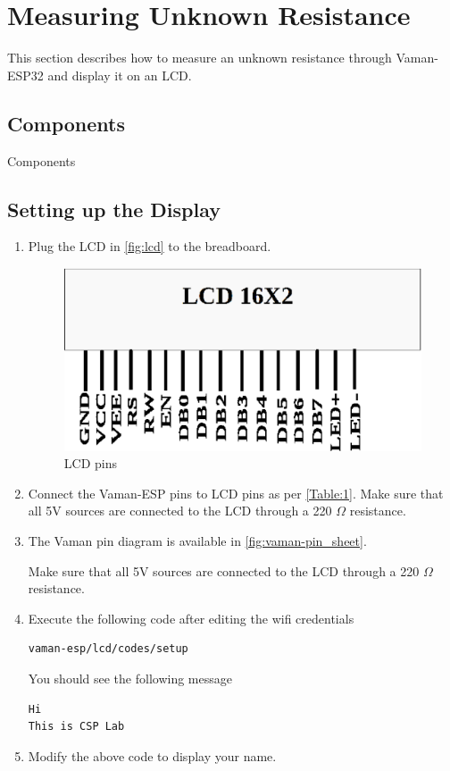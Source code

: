 \section{Measuring Unknown Resistance}
This section describes how to measure an unknown resistance through Vaman-ESP32
and display it on an LCD.
\subsection{Components}
\begin{table}[!ht]
\centering

\caption{Components}
\label{table:components}
\end{table}

\subsection{Setting up the Display}
\begin{enumerate}
\item
Plug the LCD in \autoref{fig:lcd} to the breadboard.

\begin{figure}
\centering
\includegraphics[width=\columnwidth]{vaman-esp32/lcd/figs/lcd.eps}
\caption{LCD pins}
\label{fig:lcd}
\end{figure}
\item
Connect the Vaman-ESP pins to LCD pins as per \autoref{Table:1}. Make sure that
all 5V sources are connected to the LCD through a 220 $\Omega$ resistance.
\item
The Vaman pin diagram is available in \autoref{fig:vaman-pin_sheet}.
\begin{table}[!ht]
\centering

\caption{Make sure that all 5V sources are connected to the LCD through a 220 $\Omega$ resistance.}
\label{Table:1}
\end{table}

\item Execute the following code after editing the wifi credentials
\begin{lstlisting}
vaman-esp/lcd/codes/setup
\end{lstlisting}
You should see the following message
\begin{lstlisting}
Hi
This is CSP Lab
\end{lstlisting}
\item Modify the above code to display your name.
\end{enumerate}

